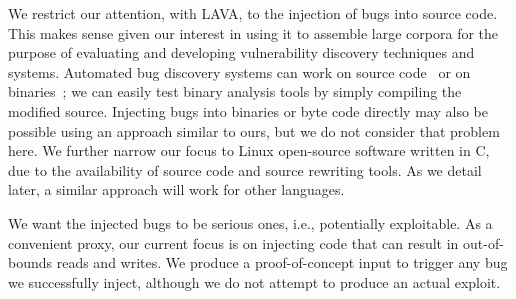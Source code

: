 
We restrict our attention, with LAVA, to the injection of bugs into source code.
This makes sense given our interest in using it to assemble large corpora for the purpose of evaluating and developing vulnerability discovery techniques and systems.
Automated bug discovery systems can work on source
code~\cite{Cadar:2008, Ganesh:2009, Haller:2013, Yamaguchi:2014} or on
binaries~\cite{Cha:2012, Wang:2010};
we can easily test binary analysis tools by simply compiling the modified source.
Injecting bugs into binaries or byte code directly may also be possible using an approach similar to ours, but we do not consider that problem here.
We further narrow our focus to Linux open-source software written in C, due to the availability of source code and source rewriting tools.
As we detail later, a similar approach will work for other languages.

We want the injected bugs to be serious ones, i.e., potentially exploitable.
As a convenient proxy, our current focus is on injecting code that can result in out-of-bounds reads and writes.  
We produce a proof-of-concept input to trigger any bug we successfully inject, although we do not attempt to produce an actual exploit.
